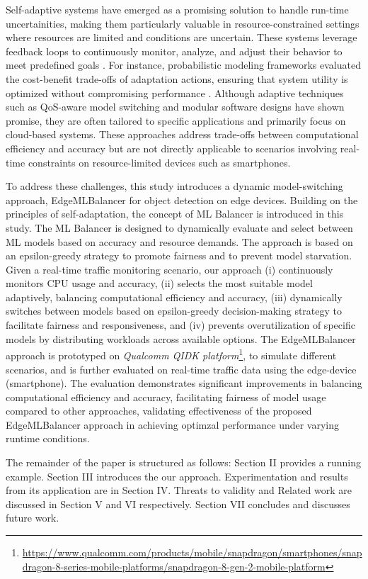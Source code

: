 Self-adaptive systems have emerged as a promising solution to handle run-time uncertainities, making them particularly valuable in resource-constrained settings where resources are limited and conditions are uncertain. These systems leverage feedback loops to continuously monitor, analyze, and adjust their behavior to meet predefined goals \cite{b35}. For instance, probabilistic modeling frameworks evaluated the cost-benefit trade-offs of adaptation actions, ensuring that system utility is optimized without compromising performance \cite{b23}. Although adaptive techniques such as QoS-aware model switching and modular software designs \cite{b3}\cite{b15} have shown promise, they are often tailored to specific applications and primarily focus on cloud-based systems. These approaches address trade-offs between computational efficiency and accuracy but are not directly applicable to scenarios involving real-time constraints on resource-limited devices such as smartphones. 

To address these challenges, this study introduces a dynamic model-switching approach, EdgeMLBalancer for object detection on edge devices. Building on the principles of self-adaptation, the concept of ML Balancer is introduced in this study. The ML Balancer is designed to dynamically evaluate and select between ML models based on accuracy and resource demands. The approach is based on an epsilon-greedy strategy to promote fairness and to prevent model starvation. Given a real-time traffic monitoring scenario, our approach (i) continuously monitors CPU usage and accuracy, (ii) selects the most suitable model adaptively, balancing computational efficiency and accuracy, (iii) dynamically switches between models based on epsilon-greedy decision-making strategy to facilitate fairness and responsiveness, and (iv) prevents overutilization of specific models by distributing workloads across available options. The EdgeMLBalancer approach is prototyped on \textit{Qualcomm QIDK platform}\footnote{\url{https://www.qualcomm.com/products/mobile/snapdragon/smartphones/snapdragon-8-series-mobile-platforms/snapdragon-8-gen-2-mobile-platform}}, to simulate different scenarios, and is further evaluated on real-time traffic data using the edge-device (smartphone). The evaluation demonstrates significant improvements in balancing computational efficiency and accuracy, facilitating fairness of model usage compared to other approaches, validating effectiveness of the proposed EdgeMLBalancer approach in achieving optimzal performance under varying runtime conditions.

The remainder of the paper is structured as follows: Section II provides a running example. Section III introduces the our approach. Experimentation and results from its application are in Section IV. Threats to validity and Related work are discussed in Section V and VI respectively. Section VII concludes and discusses future work.

 